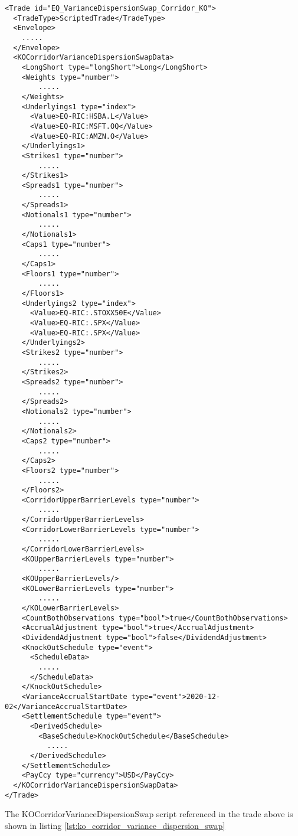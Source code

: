 \begin{verbatim}
<Trade id="EQ_VarianceDispersionSwap_Corridor_KO">
  <TradeType>ScriptedTrade</TradeType>
  <Envelope>
    .....
  </Envelope>
  <KOCorridorVarianceDispersionSwapData>
    <LongShort type="longShort">Long</LongShort>
    <Weights type="number">
        .....
    </Weights>
    <Underlyings1 type="index">
      <Value>EQ-RIC:HSBA.L</Value>
      <Value>EQ-RIC:MSFT.OQ</Value>
      <Value>EQ-RIC:AMZN.O</Value>
    </Underlyings1>
    <Strikes1 type="number">
        .....
    </Strikes1>
    <Spreads1 type="number">
        .....
    </Spreads1>
    <Notionals1 type="number">
        .....
    </Notionals1>
    <Caps1 type="number">
        .....
    </Caps1>
    <Floors1 type="number">
        .....
    </Floors1>
    <Underlyings2 type="index">
      <Value>EQ-RIC:.STOXX50E</Value>
      <Value>EQ-RIC:.SPX</Value>
      <Value>EQ-RIC:.SPX</Value>
    </Underlyings2>
    <Strikes2 type="number">
        .....
    </Strikes2>
    <Spreads2 type="number">
        .....
    </Spreads2>
    <Notionals2 type="number">
        .....
    </Notionals2>
    <Caps2 type="number">
        .....
    </Caps2>
    <Floors2 type="number">
        .....
    </Floors2>
    <CorridorUpperBarrierLevels type="number">
        .....
    </CorridorUpperBarrierLevels>
    <CorridorLowerBarrierLevels type="number">
        .....
    </CorridorLowerBarrierLevels>
    <KOUpperBarrierLevels type="number">
        .....
    <KOUpperBarrierLevels/>
    <KOLowerBarrierLevels type="number">
        .....
    </KOLowerBarrierLevels>
    <CountBothObservations type="bool">true</CountBothObservations>
    <AccrualAdjustment type="bool">true</AccrualAdjustment>
    <DividendAdjustment type="bool">false</DividendAdjustment>
    <KnockOutSchedule type="event">
      <ScheduleData>
        .....
      </ScheduleData>
    </KnockOutSchedule>
    <VarianceAccrualStartDate type="event">2020-12-02</VarianceAccrualStartDate>
    <SettlementSchedule type="event">
      <DerivedSchedule>
        <BaseSchedule>KnockOutSchedule</BaseSchedule>
          .....
      </DerivedSchedule>
    </SettlementSchedule>
    <PayCcy type="currency">USD</PayCcy>
  </KOCorridorVarianceDispersionSwapData>
</Trade>
\end{verbatim}

The KOCorridorVarianceDispersionSwap script referenced in the trade above is shown in listing
\ref{lst:ko_corridor_variance_dispersion_swap}

